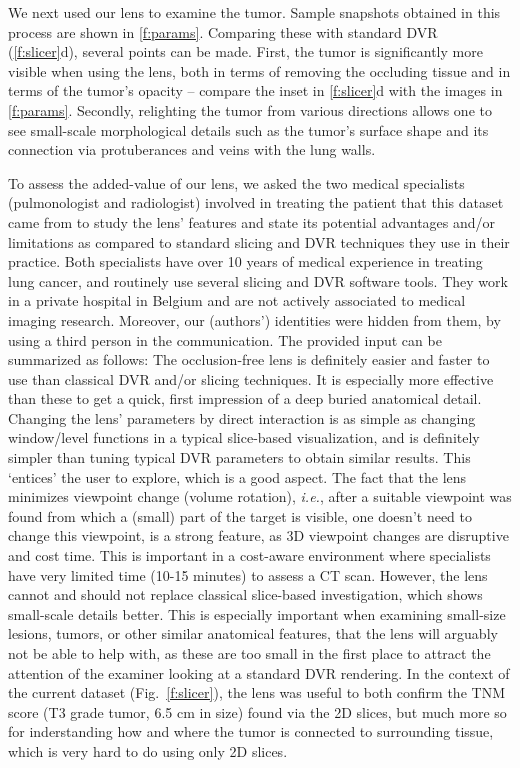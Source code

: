 We next used our lens to examine the tumor. Sample snapshots obtained in this process are shown in \autoref{f:params}. Comparing these with standard DVR (\autoref{f:slicer}d), several points can be made. First, the tumor is significantly more visible when using the lens, both in terms of removing the occluding tissue and in terms of the tumor's opacity -- compare the inset in \autoref{f:slicer}d with the images in \autoref{f:params}. Secondly, relighting the tumor from various directions allows one to see small-scale morphological details such as the tumor's surface shape and its connection via protuberances and veins with the lung walls.

To assess the added-value of our lens, we asked the two medical specialists (pulmonologist and radiologist) involved in treating the patient that this dataset came from to study the lens' features and state its potential advantages and/or limitations as compared to standard slicing and DVR techniques they use in their practice. Both specialists have over 10 years of medical experience in treating lung cancer, and routinely use several slicing and DVR software tools. They work in a private hospital in Belgium and are not actively associated to medical imaging research. Moreover, our (authors') identities were hidden from them, by using a third person in the communication. The provided input can be summarized as follows: The occlusion-free lens is definitely easier and faster to use than classical DVR and/or slicing techniques. It is especially more effective than these to get a quick, first impression of a deep buried anatomical detail. Changing the lens' parameters by direct interaction is as simple as changing window/level functions in a typical slice-based visualization, and is definitely simpler than tuning typical DVR parameters to obtain similar results. This `entices' the user to explore, which is a good aspect. The fact that the lens minimizes viewpoint change (volume rotation), \emph{i.e.}, after a suitable viewpoint was found from which a (small) part of the target is visible, one doesn't need to change this viewpoint, is a strong feature, as 3D viewpoint changes are disruptive and cost time. This is important in a cost-aware environment where specialists have very limited time (10-15 minutes) to  assess a CT scan. However, the lens cannot and should not replace classical slice-based investigation, which shows small-scale details better. This is especially important when examining small-size lesions, tumors, or other similar anatomical features, that the lens will arguably not be able to help with, as these are too small in the first place to attract the attention of the examiner looking at a standard DVR rendering. In the context of the current dataset (Fig.~\ref{f:slicer}), the lens was useful to both confirm the TNM score (T3 grade tumor, 6.5 cm in size) found via the 2D slices, but much more so for inderstanding how and where the tumor is connected to surrounding tissue, which is very hard to do using only 2D slices.


